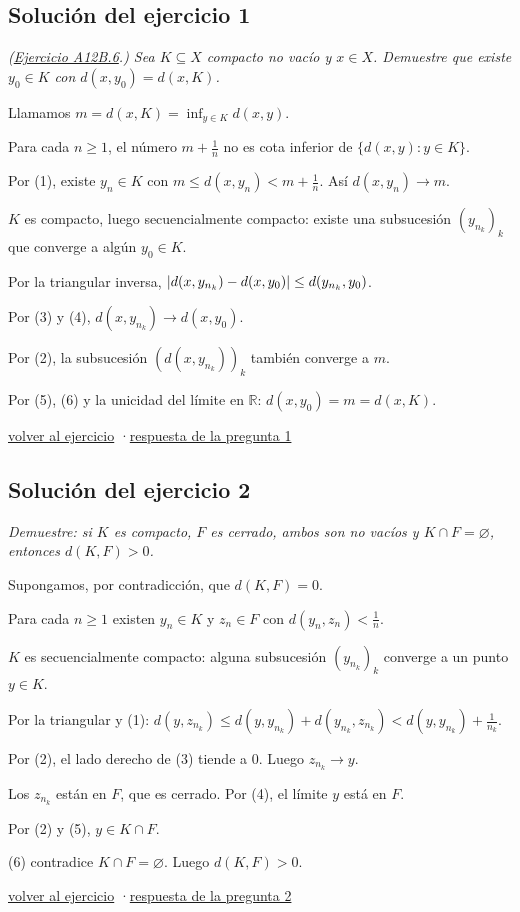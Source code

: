 \documentclass[11pt,a4paper]{article}
\newcommand{\R}{\mathbb{R}}\newcommand{\N}{\mathbb{N}}\newcommand{\Q}{\mathbb{Q}}
\providecommand{\lt}{<}\providecommand{\gt}{>}
\begin{document}
\subsection*{\hypertarget{s-1}{}Solución del ejercicio 1}
\emph{(\href{https://decostruttivismo.github.io/MAT2514-repaso/pdf/MAT2514_apuntes_completos.pdf\#nameddest=ejercicio.A12B.6}{Ejercicio A12B.6}.) Sea $K\subseteq X$ compacto no vacío y $x\in X$. Demuestre que existe $y_0\in K$ con $d(x,y_0)=d(x,K)$.}
\begin{pasos}
\item[] Llamamos $m=d(x,K)=\inf_{y\in K}d(x,y)$.
\item[(1)] Para cada $n\ge1$, el número $m+\frac1n$ no es cota inferior de $\{d(x,y):y\in K\}$.
\item[(2)] Por (1), existe $y_n\in K$ con $m\le d(x,y_n)\lt m+\frac1n$. Así $d(x,y_n)\to m$.
\item[(3)] $K$ es compacto, luego secuencialmente compacto: existe una subsucesión $(y_{n_k})_k$ que converge a algún $y_0\in K$.
\item[(4)] Por la triangular inversa, $\lvert d(x,y_{n_k})-d(x,y_0)\rvert\le d(y_{n_k},y_0)$.
\item[(5)] Por (3) y (4), $d(x,y_{n_k})\to d(x,y_0)$.
\item[(6)] Por (2), la subsucesión $(d(x,y_{n_k}))_k$ también converge a $m$.
\item[] Por (5), (6) y la unicidad del límite en $\R$: $d(x,y_0)=m=d(x,K)$.
\end{pasos}
\par{\small \hyperlink{x-1}{volver al ejercicio} \quad·\quad \hyperlink{r-1}{respuesta de la pregunta 1}}
\subsection*{\hypertarget{s-2}{}Solución del ejercicio 2}
\emph{Demuestre: si $K$ es compacto, $F$ es cerrado, ambos son no vacíos y $K\cap F=\varnothing$, entonces $d(K,F)\gt 0$.}
\begin{pasos}
\item[] Supongamos, por contradicción, que $d(K,F)=0$.
\item[(1)] Para cada $n\ge1$ existen $y_n\in K$ y $z_n\in F$ con $d(y_n,z_n)\lt \frac1n$.
\item[(2)] $K$ es secuencialmente compacto: alguna subsucesión $(y_{n_k})_k$ converge a un punto $y\in K$.
\item[(3)] Por la triangular y (1): $d(y,z_{n_k})\le d(y,y_{n_k})+d(y_{n_k},z_{n_k})\lt d(y,y_{n_k})+\frac1{n_k}$.
\item[(4)] Por (2), el lado derecho de (3) tiende a $0$. Luego $z_{n_k}\to y$.
\item[(5)] Los $z_{n_k}$ están en $F$, que es cerrado. Por (4), el límite $y$ está en $F$.
\item[(6)] Por (2) y (5), $y\in K\cap F$.
\item[] (6) contradice $K\cap F=\varnothing$. Luego $d(K,F)\gt 0$.
\end{pasos}
\par{\small \hyperlink{x-2}{volver al ejercicio} \quad·\quad \hyperlink{r-2}{respuesta de la pregunta 2}}
\end{document}
